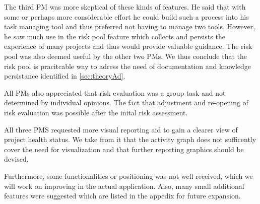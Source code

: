 The third PM was more skeptical of these kinds of features. He said that with some or perhaps more considerable effort he could build such a process into his task managing tool and thus preferred not having to manage two tools. However, he saw much use in the risk pool feature which collects and persists the experience of many projects and thus would provide valuable guidance. The risk pool was also deemed useful by the other two PMs. We thus conclude that the risk pool is pracitcable way to adress the need of documentation and knowledge persistance identified in \ref{sec:theoryAd}.

All PMs also appreciated that risk evaluation was a group task and not determined by individual opinions. The fact that adjustment and re-opening of risk evaluation was possible after the inital risk assessment.

All three PMS requested more visual reporting aid to gain a clearer view of project health status. We take from it that the activity graph does not sufficently cover the need for visualization and that further reporting graphics should be devised.

Furthermore, some functionalities or positioning was not well received, which we will work on improving in the actual application. Also, many small additional features were suggested which are listed in the appedix for future expansion.
